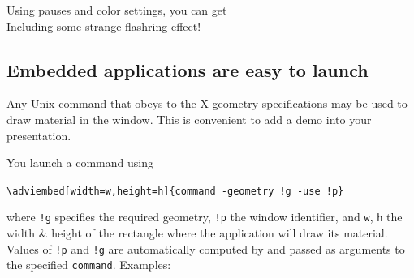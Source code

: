 \documentclass[12pt]{article}
\begin{document}
\noindent
Using pauses and color settings, you can get
\textcolor{red}{}\adviwait
{}
\textcolor{c2}{}\adviwait
{}
\textcolor{c3}{}\adviwait
{}
\textcolor{c4}{}\adviwait
{}
\textcolor{c5}{}\adviwait
{}
\textcolor{c6}{}\adviwait
{}\\
\textcolor{red}{}\adviwait
Including some strange flashring effect!
\textcolor{c6}{}\adviwait[\smallpause]%
\textcolor{c1}{}\adviwait[\smallpause]%
\textcolor{c2}{}\adviwait[\smallpause]%
\textcolor{c3}{}\adviwait[\smallpause]%
\textcolor{c4}{}\adviwait[\smallpause]%
\textcolor{c5}{}\adviwait[\smallpause]%
\textcolor{c6}{}\adviwait[\smallpause]%
\textcolor{c1}{}\adviwait[\smallpause]%
\textcolor{c2}{}\adviwait[\smallpause]%
\textcolor{c3}{}\adviwait[\smallpause]%
\textcolor{c4}{}\adviwait[\smallpause]%
\textcolor{c5}{}\adviwait[\smallpause]%
\textcolor{c6}{}\adviwait[\smallpause]%

\newpage

\subsection* {Embedded applications are easy to launch}

Any Unix command that obeys to the X geometry specifications may be
used to draw material in the {\ActiveDVI} window.
This is convenient to add a demo into your presentation.

\bigskip

\noindent
You launch a command using

\verb+\adviembed[width=w,height=h]{command -geometry !g -use !p}+

\noindent
where \verb"!g" specifies the required geometry, \verb"!p" the
{\ActiveDVI} window identifier, and \verb"w", \verb"h" the width \&
height of the rectangle where the application will draw its material.
Values of \verb"!p" and \verb"!g" are automatically computed by
{\ActiveDVI} and passed as arguments to the specified \verb"command".
 Examples:
\end{document}

